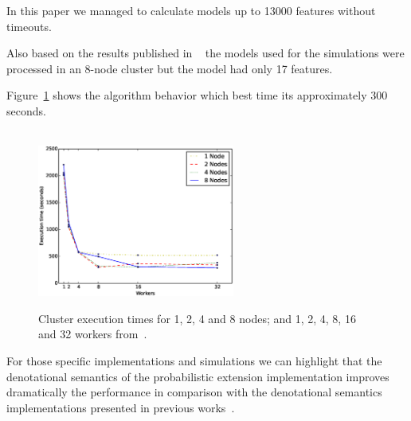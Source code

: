 In this paper we managed to calculate models up to 
13000 features without timeouts.

Also based on the results published in \fodaPAc~\cite{clc16}
the models used for the simulations were processed in 
an 8-node cluster but the model had only
17 features.

Figure~\ref{fig:cluster} shows the algorithm behavior 
which best time its approximately 300 seconds.


\begin{figure}[t]
	\centering
	\linefigure
	\\
	\includegraphics[width=0.7\hsize, height=5cm,angle=0]{plot_cluster.eps}
	\linefigure
	\caption{Cluster execution times for 1, 2, 4 and 8 nodes; and 1, 2, 4, 8, 16 and 32 workers  from~\cite{clc16}.}\label{fig:cluster}
\end{figure}

For those specific implementations and
simulations we can highlight
that the denotational semantics of the probabilistic
extension implementation improves dramatically
the performance
in comparison with the denotational semantics implementations
presented in previous works~\cite{acl13,cln16}.




















